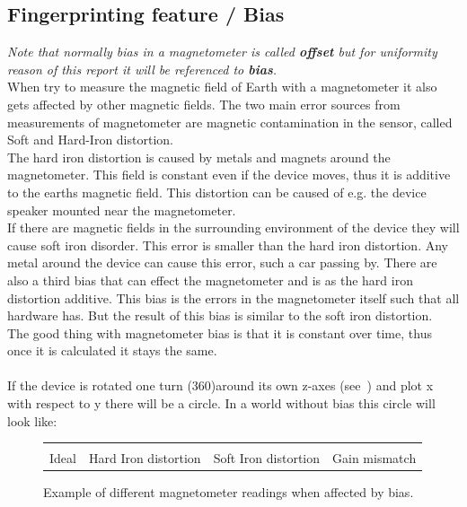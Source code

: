 \subsection{Fingerprinting feature / Bias}
\textit{Note that normally bias in a magnetometer is called \textbf{offset} but for uniformity reason of this report it will be referenced to \textbf{bias}.}\\
When try to measure the magnetic field of Earth with a magnetometer it also gets affected by other magnetic fields. The two main error sources from measurements of magnetometer are magnetic contamination in the sensor, called Soft and Hard-Iron distortion. \\
The hard iron distortion is caused by metals and magnets around the magnetometer. This field is constant even if the device moves, thus it is additive to the earths magnetic field. This distortion can be caused of e.g. the device speaker mounted near the magnetometer. \\
If there are magnetic fields in the surrounding environment of the device they will cause soft iron disorder. This error is smaller than the hard iron distortion. Any metal around the device can cause this error, such a car passing by.
There are also a third bias that can effect the magnetometer and is as the hard iron distortion additive. This bias is the errors in the magnetometer itself such that all hardware has. But the result of this bias is similar to the soft iron distortion.  \\
The good thing with magnetometer bias is that it is constant over time, thus once it is calculated it stays the same. \\
\\
If the device is rotated one turn (360\degree)around its own z-axes (see~) and plot x with respect to y there will be a circle. In a world without bias this circle will look like:
\begin{figure}[H]
\begin{tabular}{p{} p{} p{} p{}}
        \vspace{0pt}  & 
        \vspace{0pt}  & 
        \vspace{0pt}  & 
        \vspace{0pt}  \\
        \vspace{0pt} Ideal & Hard Iron distortion & Soft Iron distortion & Gain mismatch \\
\end{tabular}
\caption{Example of different magnetometer readings when affected by bias.}\label{fig:magnCircle}
\end{figure}
\cite[]{liu:magnAcc}

